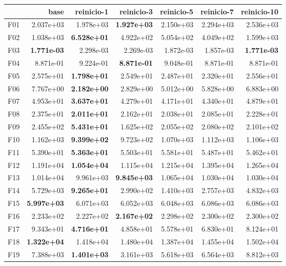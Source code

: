 \begin{tabular}{lrrrrrr}
\toprule
\textbf{} & \textbf{base} & \textbf{reinicio-1} & \textbf{reinicio-3} & \textbf{reinicio-5} & \textbf{reinicio-7} & \textbf{reinicio-10} \\
\midrule
F01 & 2.037e+03 & 1.978e+03 & \textbf{1.927e+03} & 2.150e+03 & 2.294e+03 & 2.536e+03 \\
F02 & 1.038e+03 & \textbf{6.528e+01} & 4.922e+02 & 5.054e+02 & 4.049e+02 & 1.599e+03 \\
F03 & \textbf{1.771e-03} & 2.298e-03 & 2.269e-03 & 1.872e-03 & 1.857e-03 & \textbf{1.771e-03} \\
F04 & 8.871e-01 & 9.224e-01 & \textbf{8.871e-01} & 9.048e-01 & 8.871e-01 & 8.871e-01 \\
F05 & 2.575e+01 & \textbf{1.798e+01} & 2.549e+01 & 2.487e+01 & 2.320e+01 & 2.556e+01 \\
F06 & 7.767e+00 & \textbf{2.182e+00} & 2.829e+00 & 5.012e+00 & 5.828e+00 & 6.883e+00 \\
F07 & 4.953e+01 & \textbf{3.637e+01} & 4.279e+01 & 4.171e+01 & 4.340e+01 & 4.879e+01 \\
F08 & 2.375e+01 & \textbf{2.011e+01} & 2.162e+01 & 2.038e+01 & 2.085e+01 & 2.228e+01 \\
F09 & 2.455e+02 & \textbf{5.431e+01} & 1.625e+02 & 2.055e+02 & 2.080e+02 & 2.101e+02 \\
F10 & 1.162e+03 & \textbf{9.399e+02} & 9.723e+02 & 1.070e+03 & 1.112e+03 & 1.106e+03 \\
F11 & 5.390e+01 & \textbf{5.363e+01} & 5.503e+01 & 5.581e+01 & 5.487e+01 & 5.462e+01 \\
F12 & 1.191e+04 & \textbf{1.054e+04} & 1.115e+04 & 1.215e+04 & 1.395e+04 & 1.265e+04 \\
F13 & 1.014e+04 & 9.961e+03 & \textbf{9.845e+03} & 1.065e+04 & 1.030e+04 & 1.030e+04 \\
F14 & 5.729e+03 & \textbf{9.265e+01} & 2.990e+02 & 1.410e+03 & 2.757e+03 & 4.832e+03 \\
F15 & \textbf{5.997e+03} & 6.071e+03 & 6.052e+03 & 6.048e+03 & 6.086e+03 & 6.086e+03 \\
F16 & 2.233e+02 & 2.227e+02 & \textbf{2.167e+02} & 2.298e+02 & 2.300e+02 & 2.300e+02 \\
F17 & 9.343e+01 & \textbf{4.716e+01} & 4.858e+01 & 5.578e+01 & 6.830e+01 & 8.124e+01 \\
F18 & \textbf{1.322e+04} & 1.418e+04 & 1.480e+04 & 1.387e+04 & 1.455e+04 & 1.502e+04 \\
F19 & 7.388e+03 & \textbf{1.401e+03} & 3.161e+03 & 5.618e+03 & 6.564e+03 & 8.812e+03 \\

\end{tabular}
